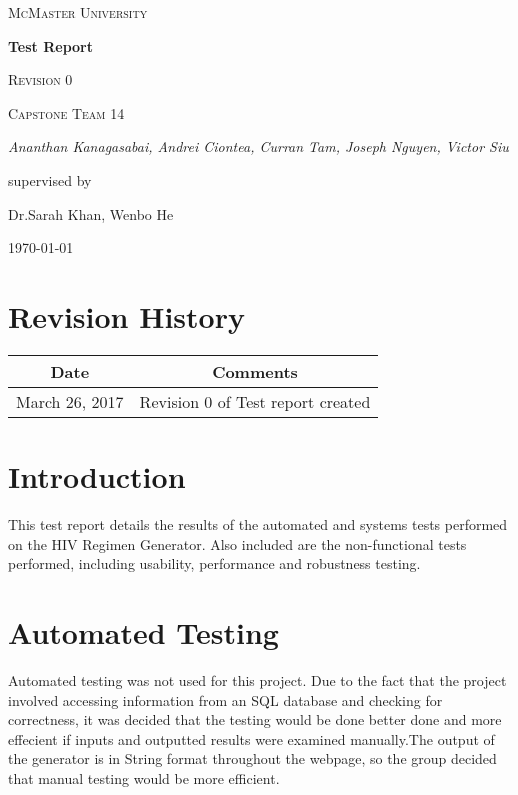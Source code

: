 \documentclass[12pt]{article}
\begin{document}
\begin{titlepage}
	\centering
	{\scshape\LARGE McMaster University \par}
	\vspace{1.5cm}
	{\huge\bfseries Test Report \par}
	{\scshape\Large Revision 0 \par}

	\vspace{1cm}
	{\scshape\Large Capstone Team 14\par}
	{\Large\itshape Ananthan Kanagasabai, Andrei Ciontea, Curran Tam, Joseph Nguyen, Victor Siu \par}
	\vspace{3cm}
	\vfill
	supervised by\par
	Dr.Sarah Khan, Wenbo He

	\vfill
	{\large \today\par}
\end{titlepage}

\newpage
\tableofcontents

\section*{Revision History}
\begin{tabular}{|c|c|}
\hline
\textbf{Date}  & \textbf{Comments} \\ \hline
March 26, 2017 & Revision 0 of Test report created \\ 
\hline
\end{tabular}

\newpage
\section{Introduction}
This test report details the results of the automated and systems tests performed on the HIV Regimen Generator. Also included are the non-functional tests performed, including usability, performance and robustness testing.

\section{Automated Testing}
Automated testing was not used for this project. Due to the fact that the project involved accessing information from an SQL database and checking for correctness, it was decided that the testing would be done better done and more effecient if inputs and outputted results were examined manually.The output of the generator is in String format throughout the webpage, so the group decided that manual testing would be more efficient.
\end{document}
